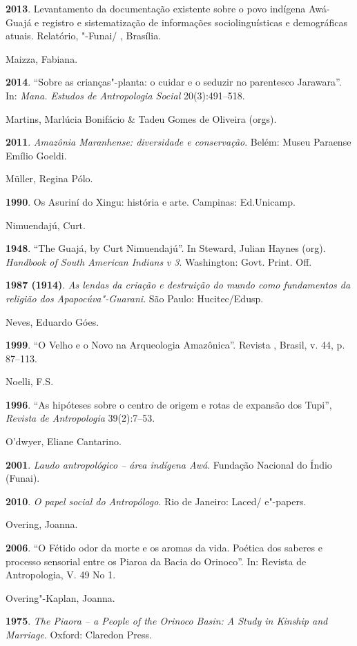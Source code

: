 \begin{Parskip}
\textbf{2013}. Levantamento da documentação existente sobre o povo
indígena Awá-Guajá e registro e sistematização de informações
sociolinguísticas e demográficas atuais. Relatório, "-Funai/ ,
Brasília.

Maizza, Fabiana.

\textbf{2014}. ``Sobre as crianças"-planta: o cuidar e o seduzir no
parentesco Jarawara''. In: \emph{Mana. Estudos de Antropologia Social}
20(3):491--518.

Martins, Marlúcia Bonifácio \& Tadeu Gomes de Oliveira (orgs).

\textbf{2011}. \emph{Amazônia Maranhense: diversidade e conservação}.
Belém: Museu Paraense Emílio Goeldi.

Müller, Regina Pólo.

\textbf{1990}. Os Asuriní do Xingu: história e arte. Campinas:
Ed.Unicamp.

Nimuendajú, Curt.

\textbf{1948}. ``The Guajá, by Curt Nimuendajú''. In Steward, Julian
Haynes (org). \emph{Handbook of South American Indians} \emph{v 3}.
Washington: Govt. Print. Off.

\textbf{1987 (1914)}. \emph{As lendas da criação e destruição do mundo
como fundamentos da religião dos Apapocúva"-Guarani}. São Paulo:
Hucitec/Edusp.

Neves, Eduardo Góes.

\textbf{1999}. ``O Velho e o Novo na Arqueologia Amazônica''. Revista
, Brasil, v. 44, p. 87--113.

Noelli, F.S.

\textbf{1996}. ``As hipóteses sobre o centro de origem e rotas de
expansão dos Tupi'', \emph{Revista de Antropologia} 39(2):7--53.

O'dwyer, Eliane Cantarino.

\textbf{2001}. \emph{Laudo antropológico -- área indígena Awá}. Fundação
Nacional do Índio (Funai).

\textbf{2010}. \emph{O papel social do Antropólogo}. Rio de Janeiro:
Laced/ e"-papers.

Overing, Joanna.

\textbf{2006}. ``O Fétido odor da morte e os aromas da vida. Poética dos
saberes e processo sensorial entre os Piaroa da Bacia do Orinoco''. In:
Revista de Antropologia, V. 49 No 1.

Overing"-Kaplan, Joanna.

\textbf{1975}. \emph{The Piaora -- a People of the Orinoco Basin: A Study
in Kinship and Marriage}. Oxford: Claredon Press.


\end{Parskip}
